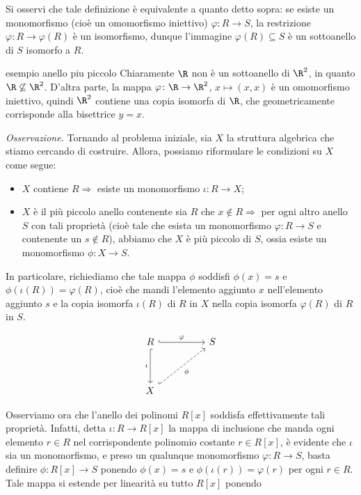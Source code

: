 \noindent Si osservi che tale definizione è equivalente a quanto detto sopra: se esiste un monomorfismo 
(cioè un omomorfismo iniettivo) $\varphi\colon R\to S$, la restrizione $\varphi\colon R\to \varphi(R)$ è un isomorfismo, 
dunque l'immagine $\varphi(R)\subseteq S$ è un sottoanello di $S$ isomorfo a $R$.

\begin{example}[]{esempio anello piu piccolo}
Chiaramente $\R$ non è un sottoanello di $\R^2$, in quanto $\R\not\subseteq \R^2$. D'altra parte, la mappa 
$\varphi\colon \R\to \R^2$, $x\mapsto (x,x)$ è un omomorfismo iniettivo, quindi $\R^2$ contiene una copia isomorfa di $\R$, 
che geometricamente corrisponde alla bisettrice $y=x$.
\end{example}

\noindent\emph{Osservazione.} Tornando al problema iniziale, sia $X$ la struttura algebrica che stiamo cercando di costruire. 
Allora, possiamo riformulare le condizioni su $X$ come segue:

\begin{itemize}
\item $X$ contiene $R\Rightarrow$ esiste un monomorfismo $\iota\colon R\to X$;
\item $X$ è il più piccolo anello contenente sia $R$ che $x\notin R\Rightarrow$ per ogni altro anello $S$ 
con tali proprietà (cioè tale che esista un monomorfismo $\varphi\colon R\to S$ e contenente un $s\notin R$), 
abbiamo che $X$ è più piccolo di $S$, ossia esiste un monomorfismo $\phi\colon X\to S$. 
\end{itemize}

\noindent In particolare, richiediamo che tale mappa $\phi$ soddisfi $\phi(x)=s$ e $\phi(\iota(R))=\varphi(R)$, 
cioè che mandi l'elemento aggiunto $x$ nell'elemento aggiunto $s$ e la copia isomorfa $\iota(R)$ di $R$ in $X$ 
nella copia isomorfa $\varphi(R)$ di $R$ in $S$.

\[
\begin{tikzcd}
R \arrow[rr, "\varphi", hook] \arrow[dd, "\iota"', hook] &  & S \\
                                                         &  &   \\
X \arrow[rruu, "\phi"', dashed, hook]                    &  &  
\end{tikzcd}
\]

\noindent Osserviamo ora che l'anello dei polinomi $R[x]$ soddisfa effettivamente tali proprietà. 
Infatti, detta $\iota\colon R\to R[x]$ la mappa di inclusione che manda ogni elemento $r\in R$ 
nel corrispondente polinomio costante $r\in R[x]$, è evidente che $\iota$ sia un monomorfismo, 
e preso un qualunque monomorfismo $\varphi\colon R\to S$, basta definire $\phi\colon R[x]\to S$ 
ponendo $\phi(x)=s$ e $\phi(\iota(r))=\varphi(r)$ per ogni $r\in R$. 
Tale mappa si estende per linearità su tutto $R[x]$ ponendo 

